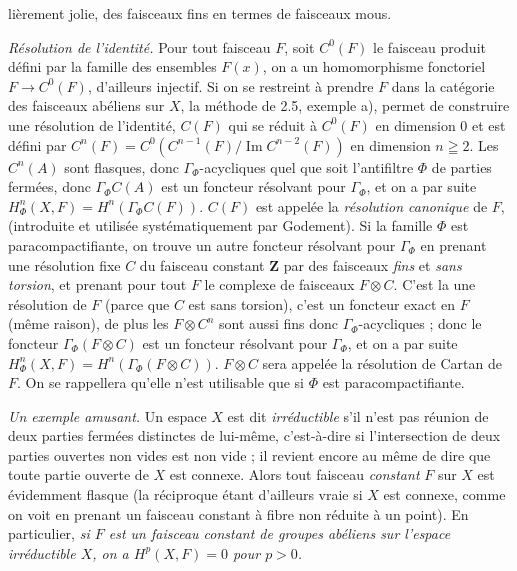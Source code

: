 
\noindent lièrement jolie, des faisceaux fins en termes de faisceaux mous.

\textit{Résolution de l'identité.} Pour tout faisceau $F$, soit $C^0(F)$ le
faisceau produit défini par la famille des ensembles $F(x)$, on a un
homomorphisme fonctoriel $F\to C^0(F)$, d'ailleurs injectif. Si
on se restreint à prendre $F$ dans la catégorie des faisceaux abéliens sur
$X$, la méthode de 2.5, exemple a), permet de construire une résolution de
l'identité, $C(F)$ qui se réduit à $C^0(F)$ en dimension 0 et est défini par
$C^n(F)=C^0(C^{n-1}(F)/\operatorname{Im}C^{n-2}(F))$
en dimension $n\geqq2$. Les $C^n(A)$ sont flasques, donc
$\Gamma_\Phi$-acycliques quel que soit l'antifiltre $\Phi$ de parties
fermées, donc $\Gamma_\Phi C(A)$ est un foncteur résolvant pour
$\Gamma_\Phi$, et on a par suite
$H^n_\Phi(X,F)=H^n(\Gamma_\Phi C(F))$.
$C(F)$ est appelée la \textit{résolution canonique} de $F$, (introduite et
utilisée systématiquement par Godement).
Si la famille $\Phi$ est paracompactifiante, on trouve un autre foncteur
résolvant pour $\Gamma_\Phi$ en prenant une résolution fixe $C$ du faisceau
constant $\mathbf Z$ par des faisceaux \textit{fins} et \textit{sans torsion}, et
prenant pour tout $F$ le complexe de faisceaux $F\otimes C$. C'est la une
résolution de $F$ (parce que $C$ est sans torsion), c'est un foncteur exact en
$F$ (même raison), de plus les $F\otimes C^n$ sont aussi fins donc
$\Gamma_\Phi$-acycliques ; donc le foncteur $\Gamma_\Phi(F\otimes C)$ est un
foncteur résolvant pour $\Gamma_\Phi$, et on a par suite
$H^n_\Phi(X,F)=H^n(\Gamma_\Phi(F\otimes C))$.
$F\otimes C$ sera appelée la résolution de Cartan de $F$. On se rappellera
qu'elle n'est utilisable que si $\Phi$ est paracompactifiante.

\textit{Un exemple amusant.} Un espace $X$ est dit \textit{irréductible} s'il
n'est pas réunion de deux parties fermées distinctes de lui-même, c'est-à-dire
si l'intersection de deux parties ouvertes non vides est non vide ; il revient
encore au même de dire que toute partie ouverte de $X$ est connexe. Alors tout
faisceau \textit{constant} $F$ sur $X$ est évidemment flasque (la réciproque
étant d'ailleurs vraie si $X$ est connexe, comme on voit en prenant un
faisceau constant à fibre non réduite à un point). En particulier, \textit{si
$F$ est un faisceau constant de groupes abéliens sur l'espace irréductible
$X$, on a $H^p(X,F)=0$ pour $p>0$.}

